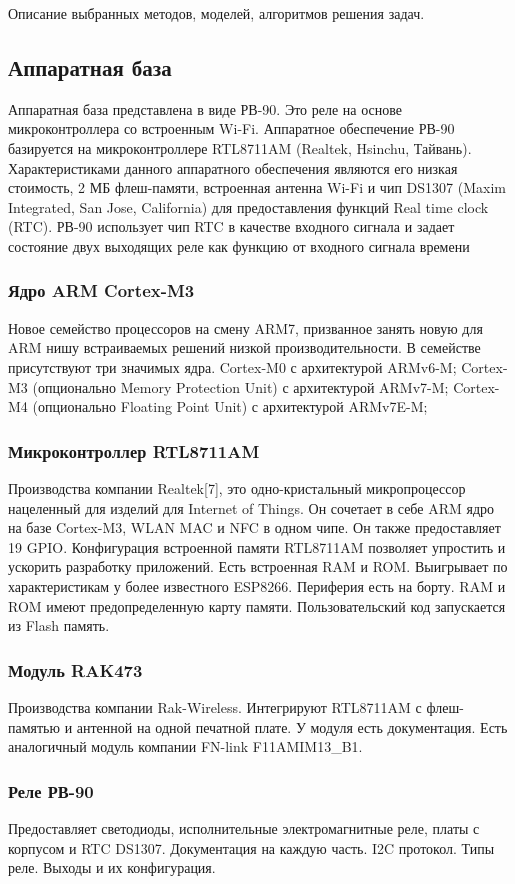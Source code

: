 Описание выбранных методов, моделей, алгоритмов решения задач.

\subsection{ Аппаратная база }
Аппаратная база представлена в виде РВ-90. Это реле на основе микроконтроллера со встроенным Wi-Fi. Аппаратное обеспечение РВ-90 базируется на микроконтроллере RTL8711AM (Realtek, Hsinchu, Тайвань). Характеристиками данного аппаратного обеспечения являются его низкая стоимость, 2 МБ флеш-памяти, встроенная антенна Wi-Fi и чип DS1307 (Maxim Integrated, San Jose, California) для предоставления функций Real time clock (RTC). РВ-90 использует чип RTC в качестве входного сигнала и задает состояние двух выходящих реле как функцию от входного сигнала времени


\subsubsection{ Ядро ARM Cortex-M3 }
Новое семейство процессоров на смену ARM7, призванное занять новую для ARM нишу встраиваемых решений низкой производительности. В семействе присутствуют три значимых ядра.
Cortex-M0 с архитектурой ARMv6-M;
Cortex-M3 (опционально Memory Protection Unit) с архитектурой ARMv7-M;
Cortex-M4 (опционально Floating Point Unit) с архитектурой ARMv7E-M;

\subsubsection{ Микроконтроллер RTL8711AM }
Производства компании Realtek[7], это одно-кристальный микропроцессор нацеленный для изделий для Internet of Things. Он сочетает в себе ARM ядро на базе Cortex-M3, WLAN MAC и NFC в одном чипе. Он также предоставляет 19 GPIO. Конфигурация встроенной памяти RTL8711AM позволяет упростить и ускорить разработку приложений. Есть встроенная RAM и ROM. Выигрывает по характеристикам у более известного ESP8266. Периферия есть на борту. RAM и ROM имеют предопределенную карту памяти. Пользовательский код запускается из Flash память.
\subsubsection{ Модуль RAK473}
Производства компании Rak-Wireless. Интегрируют RTL8711AM с флеш-памятью и антенной на одной печатной плате. У модуля есть документация.  Есть аналогичный модуль компании FN-link F11AMIM13\_B1.
\subsubsection{Реле РВ-90}
Предоставляет светодиоды, исполнительные электромагнитные реле, платы с корпусом и RTC DS1307. Документация на каждую часть. I2C протокол. Типы реле. Выходы и их конфигурация.


